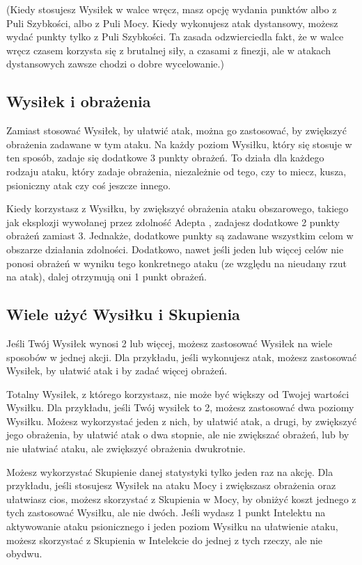 (Kiedy stosujesz Wysiłek w walce wręcz, masz opcję wydania punktów albo z Puli Szybkości, albo z Puli Mocy. Kiedy wykonujesz atak dystansowy, możesz wydać punkty tylko z Puli Szybkości. Ta zasada odzwierciedla fakt, że w walce wręcz czasem korzysta się z brutalnej siły, a czasami z finezji, ale w atakach dystansowych zawsze chodzi o dobre wycelowanie.)

\subsection{Wysiłek i obrażenia}

Zamiast stosować Wysiłek, by ułatwić atak, można go zastosować, by zwiększyć obrażenia zadawane w tym ataku. Na każdy poziom Wysiłku, który się stosuje w ten sposób, zadaje się dodatkowe 3 punkty obrażeń. To działa dla każdego rodzaju ataku, który zadaje obrażenia, niezależnie od tego, czy to miecz, kusza, psioniczny atak czy coś jeszcze innego.

Kiedy korzystasz z Wysiłku, by zwiększyć obrażenia ataku obszarowego, takiego jak eksplozji wywołanej przez zdolność Adepta , zadajesz dodatkowe 2 punkty obrażeń zamiast 3. Jednakże, dodatkowe punkty są zadawane wszystkim celom w obszarze działania zdolności. Dodatkowo, nawet jeśli jeden lub więcej celów nie ponosi obrażeń w wyniku tego konkretnego ataku (ze względu na nieudany rzut na atak), dalej otrzymują oni 1 punkt obrażeń.

\subsection{Wiele użyć Wysiłku i Skupienia}

Jeśli Twój Wysiłek wynosi 2 lub więcej, możesz zastosować Wysiłek na wiele sposobów w jednej akcji. Dla przykładu, jeśli wykonujesz atak, możesz zastosować Wysiłek, by ułatwić atak i by zadać więcej obrażeń.

Totalny Wysiłek, z którego korzystasz, nie może być większy od Twojej wartości Wysiłku. Dla przykładu, jeśli Twój wysiłek to 2, możesz zastosować dwa poziomy Wysiłku. Możesz wykorzystać jeden z nich, by ułatwić atak, a drugi, by zwiększyć jego obrażenia, by ułatwić atak o dwa stopnie, ale nie zwiększać obrażeń, lub by nie ułatwiać ataku, ale zwiększyć obrażenia dwukrotnie.

Możesz wykorzystać Skupienie danej statystyki tylko jeden raz na akcję. Dla przykładu, jeśli stosujesz Wysiłek na ataku Mocy i zwiększasz obrażenia oraz ułatwiasz cios, możesz skorzystać z Skupienia w Mocy, by obniżyć koszt jednego z tych zastosować Wysiłku, ale nie dwóch. Jeśli wydasz 1 punkt Intelektu na aktywowanie ataku psionicznego i jeden poziom Wysiłku na ułatwienie ataku, możesz skorzystać z Skupienia w Intelekcie do jednej z tych rzeczy, ale nie obydwu.

